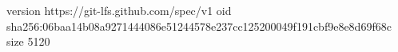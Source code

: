 version https://git-lfs.github.com/spec/v1
oid sha256:06baa14b08a9271444086e51244578e237cc125200049f191cbf9e8e8d69f68c
size 5120
